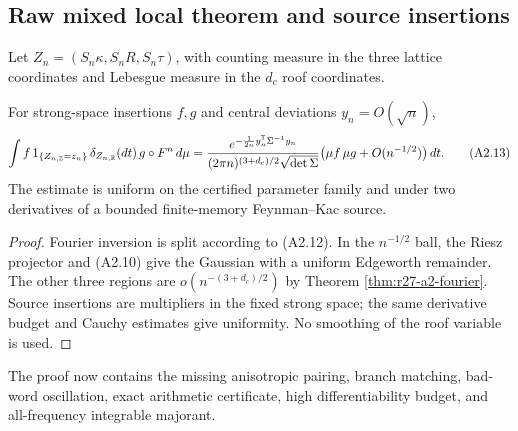 \subsection{Raw mixed local theorem and source insertions}

Let $Z_n=(S_n\kappa,S_nR,S_n\tau)$, with counting measure in the three lattice
coordinates and Lebesgue measure in the $d_c$ roof coordinates.

\begin{theorem}
\label{thm:r27-a2-llt}
For strong-space insertions $f,g$ and central deviations
$y_n=O(\sqrt n)$,
\[
 \int f\,1_{\{Z_{n,\mathbb Z}=z_n\}}\,
 \delta_{Z_{n,\mathbb R}}(dt)\,g\circ F^n\,d\mu
 =
 {e^{-\frac1{2n}y_n^\mathsf T\Sigma^{-1}y_n}
  \over(2\pi n)^{(3+d_c)/2}\sqrt{\det\Sigma}}
 \bigl(\mu f\,\mu g+O(n^{-1/2})\bigr)\,dt.                \tag{A2.13}
\]
The estimate is uniform on the certified parameter family and under two
derivatives of a bounded finite-memory Feynman--Kac source.
\end{theorem}

\begin{proof}
Fourier inversion is split according to (A2.12).  In the
$n^{-1/2}$ ball, the Riesz projector and (A2.10) give the Gaussian with a
uniform Edgeworth remainder.  The other three regions are
$o(n^{-(3+d_c)/2})$ by Theorem \ref{thm:r27-a2-fourier}.  Source insertions
are multipliers in the fixed strong space; the same derivative budget and
Cauchy estimates give uniformity.  No smoothing of the roof variable is used.
\end{proof}

The proof now contains the missing anisotropic pairing, branch matching,
bad-word oscillation, exact arithmetic certificate, high differentiability
budget, and all-frequency integrable majorant.
